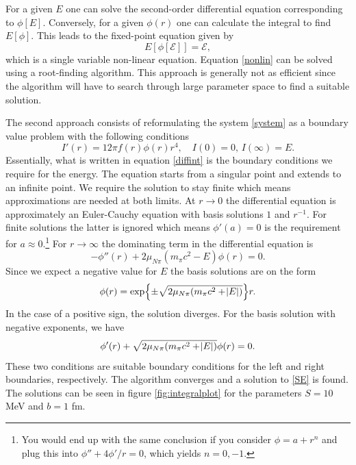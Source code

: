 For a given $E$ one can solve the second-order differential equation corresponding to $\phi[E]$. Conversely, for a given $\phi(r)$ one can calculate the integral to find $E[\phi]$. This leads to the fixed-point equation given by
\begin{equation} \label{nonlin}
	E[\phi[\mathcal{E}]] = \mathcal{E},
\end{equation}
which is a single variable non-linear equation. Equation \eqref{nonlin} can be solved using a root-finding algorithm. This approach is generally not as efficient since the algorithm will have to search through large parameter space to find a suitable solution.

The second approach consists of reformulating the system \eqref{system} as a boundary value problem with the following conditions
\begin{equation}\label{diffint}
	I'(r) = 12\pi f(r)\phi(r)r^4, \quad I(0)=0, \, I(\infty)=E.
\end{equation}
Essentially, what is written in equation \ref{diffint} is the boundary conditions we require for the energy. The equation starts from a singular point and extends to an infinite point. We require the solution to stay finite which means approximations are needed at both limits. At $r\rightarrow 0$ the differential equation is approximately an Euler-Cauchy equation with basis solutions $1$ and $r^{-1}$. For finite solutions the latter is ignored which means $\phi'(a)=0$ is the requirement for $a\approx 0$.\footnote{You would end up with the same conclusion if you consider $\phi=a+r^n$ and plug this into $\phi''+4\phi'/r=0$, which yields $n=0,-1$.} For $r\rightarrow \infty$ the dominating term in the differential equation is
\begin{equation}
	-\phi''(r)+2\mu_{N\pi}(m_\pi c^2-E)\phi(r)=0.
\end{equation}
Since we expect a negative value for $E$ the basis solutions are on the form
\begin{equation}
	\phi(r)=\exp{\pm\sqrt{2\mu_{N\pi}(m_\pi c^2+\abs{E})}}r.
\end{equation}
In the case of a positive sign, the solution diverges. For the basis solution with negative exponents, we have
\begin{equation}
	\phi'(r)+\sqrt{2\mu_{N\pi}(m_\pi c^2 +\abs{E})}\phi(r)=0.
\end{equation}
These two conditions are suitable boundary conditions for the left and right boundaries, respectively. The algorithm converges and a solution to \eqref{SE} is found. The solutions can be seen in figure \ref{fig:integralplot} for the parameters $S=10$ MeV and $b=1$ fm.
